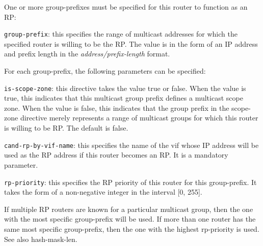 \begin{description}
  One or more group-prefixes must be specified for this router
  to function as an RP:
\begin{description}
\item{\tt group-prefix}: this specifies the range of multicast
  addresses for which the specified router is willing to be the RP.
  The value is in the form of an IP address and prefix length in the
  {\it address/prefix-length} format.  

  For each {\stt group-prefix}, the following parameters can be
  specified:
\begin{description}
\item{\tt is-scope-zone}: this directive takes the value {\stt true}
  or {\stt false}.  When the value is {\stt true}, this indicates that
  this multicast group prefix defines a multicast scope zone.  When
  the value is {\stt false}, this indicates that the group prefix in
  the {\stt scope-zone} directive merely represents a range of
  multicast groups for which this router is willing to be RP.  The
  default is {\stt false}.
\item{\tt cand-rp-by-vif-name}: this specifies the name of the {\stt
  vif} whose IP address will be used as the RP address if this router
  becomes an RP.  It is a mandatory parameter.
\item{\tt rp-priority}: this specifies the RP priority of this router
  for this {\stt group-prefix}.  It takes the form of a non-negative
  integer in the interval [0, 255].

  If multiple RP routers are known for a particular multicast group,
  then the one with the most specific {\stt group-prefix} will be
  used.  If more than one router has the same most specific {\stt
  group-prefix}, then the one with the highest {\stt rp-priority} is
  used.  See also {\stt hash-mask-len}.


\end{description}
\end{description}
\end{description}
